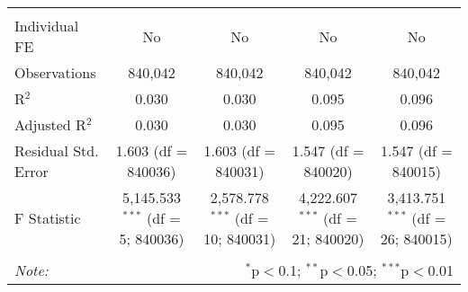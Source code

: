 \documentclass[
]{article}
\begin{document}
\begin{table}[!htbp]
{\begin{tabular}{@{\extracolsep{5pt}}lcccc}
\hline \\[-1.8ex] 
Individual FE & No & No & No & No \\ 
Observations & 840,042 & 840,042 & 840,042 & 840,042 \\ 
R$^{2}$ & 0.030 & 0.030 & 0.095 & 0.096 \\ 
Adjusted R$^{2}$ & 0.030 & 0.030 & 0.095 & 0.096 \\ 
Residual Std. Error & 1.603 (df = 840036) & 1.603 (df = 840031) & 1.547 (df = 840020) & 1.547 (df = 840015) \\ 
F Statistic & 5,145.533$^{***}$ (df = 5; 840036) & 2,578.778$^{***}$ (df = 10; 840031) & 4,222.607$^{***}$ (df = 21; 840020) & 3,413.751$^{***}$ (df = 26; 840015) \\ 
\hline 
\hline \\[-1.8ex] 
\textit{Note:}  & \multicolumn{4}{r}{$^{*}$p$<$0.1; $^{**}$p$<$0.05; $^{***}$p$<$0.01} \\ 
\end{tabular}
} 
\end{table} 
\newpage
\end{document}
